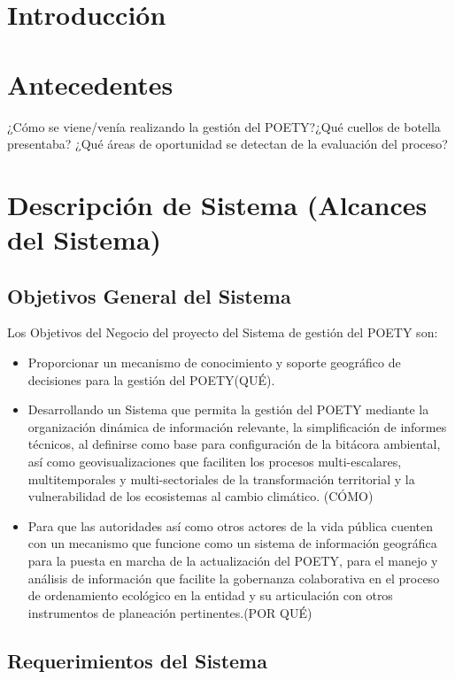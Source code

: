 \section{Introducción}

\section{Antecedentes}

¿Cómo se viene/venía realizando la gestión del POETY?¿Qué cuellos de botella presentaba? ¿Qué áreas de oportunidad se detectan de la evaluación del proceso?
\section{Descripción de Sistema (Alcances del Sistema)}

\subsection{Objetivos General del Sistema}

Los Objetivos del Negocio del proyecto del Sistema de gestión del POETY son:
\begin{itemize}
\item Proporcionar un mecanismo de conocimiento y soporte geográfico de decisiones para la gestión del POETY(QUÉ).
\item Desarrollando un Sistema que permita la gestión del POETY mediante la organización dinámica de información relevante, la simplificación de informes técnicos, al definirse como base para configuración de la bitácora ambiental, así como geovisualizaciones que faciliten los procesos multi-escalares, multitemporales y multi-sectoriales de la transformación territorial y la vulnerabilidad de los ecosistemas al cambio climático. (CÓMO)
\item Para que las autoridades así como otros actores de la vida pública cuenten con un mecanismo que funcione como un sistema de información geográfica para la puesta en marcha de la actualización del POETY, para el manejo y análisis de información que facilite la gobernanza colaborativa en el proceso de ordenamiento ecológico en la entidad y su articulación con otros instrumentos de planeación pertinentes.(POR QUÉ)
\end{itemize}

\pagebreak
\subsection{Requerimientos del Sistema}


